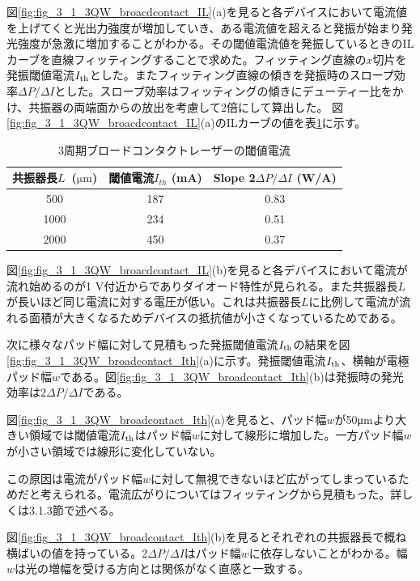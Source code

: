 図\ref{fig:fig_3_1_3QW_broacdcontact_IL}(a)を見ると各デバイスにおいて電流値を上げてくと光出力強度が増加していき、ある電流値を超えると発振が始まり発光強度が急激に増加することがわかる。その閾値電流値を発振しているときのILカーブを直線フィッティングすることで求めた。フィッティング直線の$x$切片を発振閾値電流$I_{\rm{th}}$とした。またフィッティング直線の傾きを発振時のスロープ効率$\Delta P/\Delta I$とした。スロープ効率はフィッティングの傾きにデューティー比をかけ、共振器の両端面からの放出を考慮して2倍にして算出した。
図\ref{fig:fig_3_1_3QW_broacdcontact_IL}(a)のILカーブの値を表\ref{table:table_3_1_3QW_broadcontact}に示す。
\begin{table}[h]
  \caption{3周期ブロードコンタクトレーザーの閾値電流}
  \label{table:table_3_1_3QW_broadcontact}
  \centering
  \begin{tabular}{ccc}
    \hline
    共振器長$L$\ ($\si{\micro\metre}$)  & 閾値電流$I_{th}$ (mA)  & Slope 2$\Delta P/\Delta I$ (W/A) \\
    \hline \hline
     500& 187&  0.83  \\
    1000& 234& 0.51\\
    2000& 450&0.37\\
       \hline
  \end{tabular}
\end{table}



図\ref{fig:fig_3_1_3QW_broacdcontact_IL}(b)を見ると各デバイスにおいて電流が流れ始めるのが1 V付近からでありダイオード特性が見られる。また共振器長$L$が長いほど同じ電流に対する電圧が低い。これは共振器長$L$に比例して電流が流れる面積が大きくなるためデバイスの抵抗値が小さくなっているためである。


次に様々なパッド幅に対して見積もった発振閾値電流$I_{\rm{th}}$の結果を図\ref{fig:fig_3_1_3QW_broadcontact_Ith}(a)に示す。発振閾値電流$I_{\rm{th}}$、横軸が電極パッド幅$w$である。図\ref{fig:fig_3_1_3QW_broadcontact_Ith}(b)は発振時の発光効率は$2 \Delta P/\Delta I$である。

図\ref{fig:fig_3_1_3QW_broadcontact_Ith}(a)を見ると、パッド幅$w$が50\si{ \micro\metre}より大きい領域では閾値電流$I_{\rm{th}}$はパッド幅$w$に対して線形に増加した。一方パッド幅$w$が小さい領域では線形に変化していない。

この原因は電流がパッド幅$w$に対して無視できないほど広がってしまっているためだと考えられる。電流広がりについてはフィッティングから見積もった。詳しくは3.1.3節で述べる。

図\ref{fig:fig_3_1_3QW_broadcontact_Ith}(b)を見るとそれぞれの共振器長で概ね横ばいの値を持っている。2$\Delta P/\Delta I$はパッド幅$w$に依存しないことがわかる。幅$w$は光の増幅を受ける方向とは関係がなく直感と一致する。

